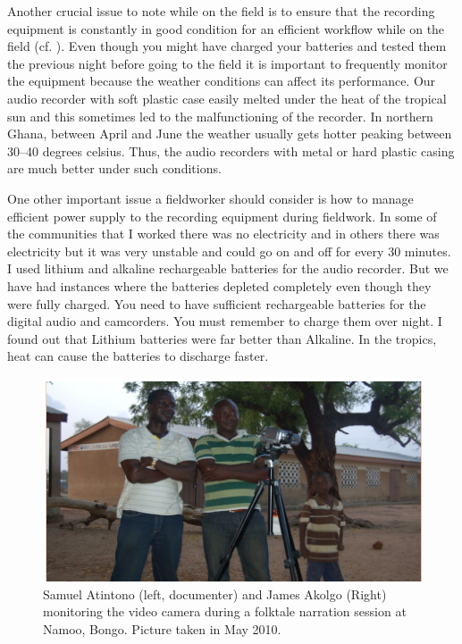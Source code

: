 \documentclass[output=paper,colorlinks,citecolor=brown]{langscibook}
\begin{document}
Another crucial issue to note while on the field is to ensure that the recording equipment is constantly in good condition for an efficient workflow while on the field (cf. \citealt{Bowern2015}). Even though you might have charged your batteries and tested them the previous night before going to the field it is important to frequently monitor the equipment because the weather conditions can affect its performance. Our audio recorder with soft plastic case easily melted under the heat of the tropical sun and this sometimes led to the malfunctioning of the recorder. In northern Ghana, between April and June the weather usually gets hotter peaking between 30--40 degrees celsius. Thus, the audio recorders with metal or hard plastic casing are much better under such conditions.

One other important issue a fieldworker should consider is how to manage efficient power supply to the recording equipment during fieldwork. In some of the communities that I worked there was no electricity and in others there was electricity but it was very unstable and could go on and off for every 30 minutes. I used lithium and alkaline rechargeable batteries for the audio recorder. But we have had instances where the batteries depleted completely even though they were fully charged. You need to have sufficient rechargeable batteries for the digital audio and camcorders. You must remember to charge them over night. I found out that Lithium batteries were far better than Alkaline. In the tropics, heat can cause the batteries to discharge faster.

\begin{figure}
\includegraphics[width=\textwidth]{figures/samuel.png}
\caption{Samuel Atintono (left, documenter) and James Akolgo (Right) monitoring the video 
 		camera during a folktale narration session at Namoo, Bongo. Picture taken in May 2010.}
\end{figure}
\end{document}
